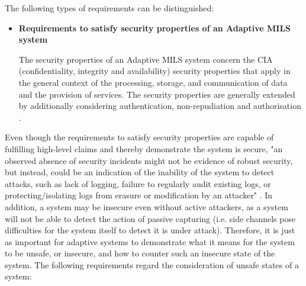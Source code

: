 \documentclass[12pt,twoside,a4paper]{article}
\begin{document}
The following types of requirements can be distinguished:
\begin{itemize}
\item \textbf{Requirements to satisfy security properties of an Adaptive MILS system}

The security properties of an Adaptive MILS system concern the CIA (confidentiality, integrity and availability) security properties that apply in the general context of the processing, storage, and communication of data and the provision of services. The security properties are generally extended by additionally considering authentication, non-repudiation and authorisation \cite{Lipson13evidence-of-assurance}. 
\end{itemize}


Even though the requirements to satisfy security properties are capable of fulfilling high-level claims and thereby demonstrate the system is secure, "an observed absence of security incidents might not be evidence of robust security, but instead, could be an indication of the inability of the system to detect attacks, such as lack of logging, failure to regularly audit existing logs, or protecting/isolating logs from erasure or modification by an attacker" \cite{Lipson13evidence-of-assurance}. In addition, a system may be insecure even without active attackers, as a system will not be able to detect the action of passive capturing (i.e. side channels pose difficulties for the system itself to detect it is under attack). Therefore, it is just as important for adaptive systems to demonstrate what it means for the system to be unsafe, or insecure, and how to counter such an insecure state of the system. The following requirements regard the consideration of unsafe states of a system:
\end{document}
